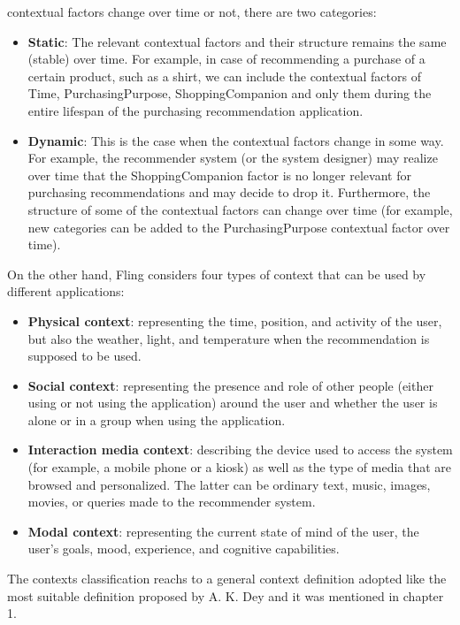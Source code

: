 \begin{enumerate}
contextual factors change over time or not, there are two categories: 
	\begin{itemize}
	\item \textbf{Static}: The relevant contextual factors and their structure
	remains the same (stable) over time. For example, in case of recommending a
	purchase of a certain product, such as a shirt, we can include the
	contextual factors of Time, PurchasingPurpose, ShoppingCompanion and only
	them during the entire lifespan of the purchasing recommendation
	application.
	\item \textbf {Dynamic}: This is the case when the contextual factors change in 
	some way. For example, the recommender system (or the system designer) may 
	realize over time that the ShoppingCompanion factor is no longer relevant for 
	purchasing recommendations and may decide to drop it. Furthermore, the structure 
	of some of the contextual factors can change over time (for example, new 
	categories can be added to the PurchasingPurpose contextual factor over time).
	\end{itemize}
\end{enumerate} 
On the other hand, Fling\cite{fling2009mobile} considers four types of context that 
can be used by different applications:  %
\begin{itemize} 
\item \textbf{Physical context}: representing the time, position, and activity 
of the user, but also the weather, light, and temperature when the 
recommendation is supposed to be used. 
\item \textbf{Social context}: representing the presence
and role of other people (either using or not using the application) around the
user and whether the user is alone or in a group when using the application.
\item \textbf{Interaction media context}: describing the device used to access
the system (for example, a mobile phone or a kiosk) as well as the type of media
that are browsed and personalized. The latter can be ordinary text, music,
images, movies, or queries made to the recommender system. 
\item \textbf{Modal context}: representing the current state of mind of the user, 
the user’s goals, mood, experience, and cognitive capabilities.  
\end{itemize}
The contexts classification reachs to a general context definition %
adopted like the most suitable definition proposed by A. K. Dey  and it
was mentioned in chapter 1.\\ 

